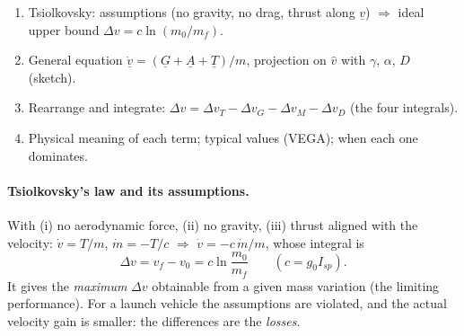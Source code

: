 \begin{outline}
\begin{enumerate}
\item Tsiolkovsky: assumptions (no gravity, no drag, thrust along $\underline v$) $\Rightarrow$ ideal upper bound $\Delta v=c\ln(m_0/m_f)$.
\item General equation $\dot{\underline v}=(\underline G+\underline A+\underline T)/m$, projection on $\hat v$ with $\gamma$, $\alpha$, $D$ (sketch).
\item Rearrange and integrate: $\Delta v=\Delta v_T-\Delta v_G-\Delta v_M-\Delta v_D$ (the four integrals).
\item Physical meaning of each term; typical values (VEGA); when each one dominates.
\end{enumerate}
\end{outline}

\answer
\paragraph{Tsiolkovsky's law and its assumptions.} With (i) no aerodynamic force, (ii) no gravity, (iii) thrust aligned with
the velocity: $\dot v=T/m$, $\dot m=-T/c$ $\Rightarrow$ $\dot v=-c\,\dot m/m$, whose integral is
\begin{equation}
\Delta v=v_f-v_0=c\ln\frac{m_0}{m_f}\qquad(c=g_0I_{sp}).
\end{equation}
It gives the \emph{maximum} $\Delta v$ obtainable from a given mass variation (the limiting performance). For a launch vehicle
the assumptions are violated, and the actual velocity gain is smaller: the differences are the \emph{losses}.

